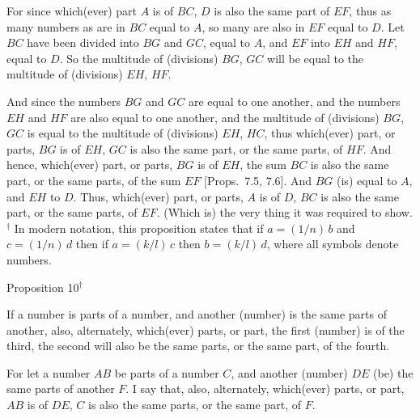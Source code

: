For since which(ever) part $A$ is of $BC$, $D$ is also the same part of $EF$, thus
as many numbers as are in $BC$ equal to $A$, so many are also in $EF$ equal to
$D$. Let $BC$ have been divided into $BG$ and $GC$, equal to $A$, and $EF$ into
$EH$ and $HF$, equal to $D$. So the multitude of (divisions) $BG$, $GC$ will be
equal to the multitude of (divisions) $EH$, $HF$.

And since the numbers $BG$ and $GC$ are equal to one another, and
the numbers $EH$ and $HF$ are also equal to one another, and the
multitude of (divisions) $BG$, $GC$ is equal to the multitude of (divisions)
$EH$, $HC$, thus which(ever) part, or parts, $BG$ is of $EH$, $GC$ is also
the same part, or the same parts, of $HF$. And hence, which(ever)
part, or parts, $BG$ is of $EH$, the sum $BC$ is also the same
part, or the same parts, of the sum $EF$ [Props.~7.5, 7.6]. And $BG$ (is) equal to $A$, and $EH$ to $D$.
 Thus, which(ever) part, or parts, $A$ is of $D$, $BC$ is also the same part, or
 the same parts, of $EF$. (Which is) the very thing it was required to show.
{\footnotesize\noindent$^\dag$ In modern notation, this
proposition states that if $a=(1/n)\,b$ and $c=(1/n)\,d$ then if $a=(k/l)\,c$
then $b = (k/l)\,d$, where all symbols denote numbers.}


\begin{center}
{\large Proposition 10}$^\dag$
\end{center}

If a number is parts of a number, and another (number) is the same parts of another, also, alternately, which(ever) parts, or part, 
the first (number) is of the third, the second will also be the same
parts, or the same part, of the fourth.

For let a number $AB$ be parts of a number $C$, and another (number)
$DE$ (be) the same parts of another $F$. I say that, also, alternately, which(ever)
parts, or part, $AB$ is of $DE$, $C$ is also the same parts, or the same part,
of $F$.

\epsfysize=2in
\centerline{}

